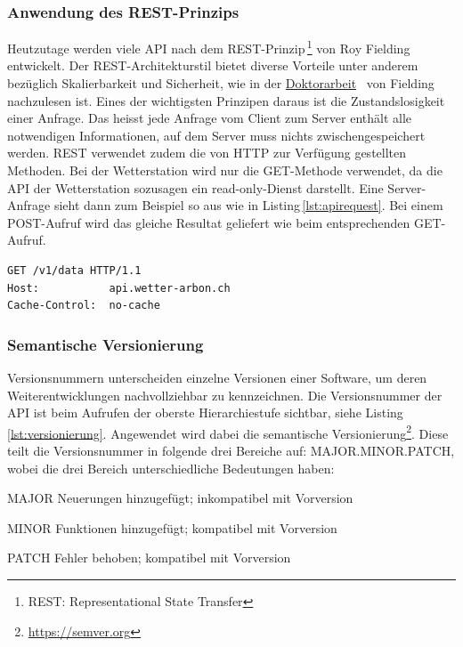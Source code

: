 

\subsubsection{Anwendung des REST-Prinzips}
Heutzutage werden viele API nach dem REST-Prinzip\,\footnote{REST: Representational State Transfer} von Roy Fielding entwickelt. Der REST-Architekturstil bietet diverse Vorteile unter anderem bezüglich Skalierbarkeit und Sicherheit, wie in der \href{https://www.ics.uci.edu/~fielding/pubs/dissertation/top.htm}{Doktorarbeit}~\cite{Fielding:2000:ASD:932295} von Fielding nachzulesen ist. Eines der wichtigsten Prinzipen daraus ist die Zustandslosigkeit einer Anfrage. Das heisst jede Anfrage vom Client zum Server enthält alle notwendigen Informationen, auf dem Server muss nichts zwischengespeichert werden. REST verwendet zudem die von HTTP zur Verfügung gestellten Methoden\cite{LornaJaneMitchell2013oreilly}. Bei der Wetterstation wird nur die GET-Methode verwendet, da die API der Wetterstation sozusagen ein read-only-Dienst darstellt. Eine Server-Anfrage sieht dann zum Beispiel so aus wie in Listing\,\ref{lst:apirequest}. Bei einem POST-Aufruf wird das gleiche Resultat geliefert wie beim entsprechenden GET-Aufruf.


\vspace{3mm}
\begin{lstlisting}[label=lst:apirequest,caption=RESTful-Serveranfrage, language=HTML5, style=php]
GET /v1/data HTTP/1.1
Host:           api.wetter-arbon.ch
Cache-Control:  no-cache
\end{lstlisting}
\vspace{3mm}


\subsubsection{Semantische Versionierung}
Versionsnummern unterscheiden einzelne Versionen einer Software, um deren Weiterentwicklungen nachvollziehbar zu kennzeichnen. Die Versionsnummer der API ist beim Aufrufen der oberste Hierarchiestufe sichtbar, siehe Listing\,\ref{lst:versionierung}. Angewendet wird dabei die semantische Versionierung\footnote{\url{https://semver.org}}. Diese teilt die Versionsnummer in folgende drei Bereiche auf: MAJOR.MINOR.PATCH, wobei die drei Bereich unterschiedliche Bedeutungen haben:

\begin{description*}
  \item[MAJOR] Neuerungen hinzugefügt; inkompatibel mit Vorversion
  \item[MINOR] Funktionen hinzugefügt; kompatibel mit Vorversion
  \item[PATCH] Fehler behoben; kompatibel mit Vorversion
\end{description*}

